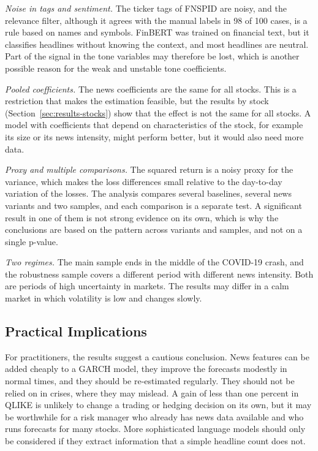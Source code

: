 \documentclass[12pt,a4paper]{article}
\begin{document}
\emph{Noise in tags and sentiment.} The ticker tags of FNSPID are noisy, and the relevance filter, although it agrees with the manual labels in 98 of 100 cases, is a rule based on names and symbols. FinBERT was trained on financial text, but it classifies headlines without knowing the context, and most headlines are neutral. Part of the signal in the tone variables may therefore be lost, which is another possible reason for the weak and unstable tone coefficients.

\emph{Pooled coefficients.} The news coefficients are the same for all stocks. This is a restriction that makes the estimation feasible, but the results by stock (Section~\ref{sec:results-stocks}) show that the effect is not the same for all stocks. A model with coefficients that depend on characteristics of the stock, for example its size or its news intensity, might perform better, but it would also need more data.

\emph{Proxy and multiple comparisons.} The squared return is a noisy proxy for the variance, which makes the loss differences small relative to the day-to-day variation of the losses. The analysis compares several baselines, several news variants and two samples, and each comparison is a separate test. A significant result in one of them is not strong evidence on its own, which is why the conclusions are based on the pattern across variants and samples, and not on a single p-value.

\emph{Two regimes.} The main sample ends in the middle of the COVID-19 crash, and the robustness sample covers a different period with different news intensity. Both are periods of high uncertainty in markets. The results may differ in a calm market in which volatility is low and changes slowly.

\subsection{Practical Implications}\label{sec:disc-practical}
For practitioners, the results suggest a cautious conclusion. News features can be added cheaply to a GARCH model, they improve the forecasts modestly in normal times, and they should be re-estimated regularly. They should not be relied on in crises, where they may mislead. A gain of less than one percent in QLIKE is unlikely to change a trading or hedging decision on its own, but it may be worthwhile for a risk manager who already has news data available and who runs forecasts for many stocks. More sophisticated language models should only be considered if they extract information that a simple headline count does not.
\end{document}
